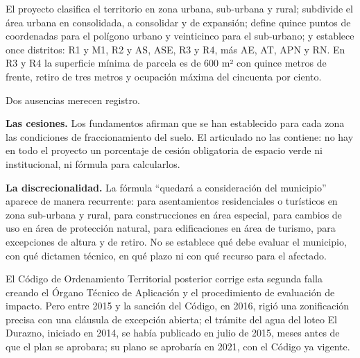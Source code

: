 El proyecto clasifica el territorio en zona urbana, sub-urbana y rural; subdivide el área urbana en consolidada, a consolidar y de expansión; define quince puntos de coordenadas para el polígono urbano y veinticinco para el sub-urbano; y establece once distritos: R1 y M1, R2 y AS, ASE, R3 y R4, más AE, AT, APN y RN. En R3 y R4 la superficie mínima de parcela es de 600 m² con quince metros de frente, retiro de tres metros y ocupación máxima del cincuenta por ciento.

Dos ausencias merecen registro.

\textbf{Las cesiones.} Los fundamentos afirman que se han establecido para cada zona las condiciones de fraccionamiento del suelo. El articulado no las contiene: no hay en todo el proyecto un porcentaje de cesión obligatoria de espacio verde ni institucional, ni fórmula para calcularlos.

\textbf{La discrecionalidad.} La fórmula ``quedará a consideración del municipio'' aparece de manera recurrente: para asentamientos residenciales o turísticos en zona sub-urbana y rural, para construcciones en área especial, para cambios de uso en área de protección natural, para edificaciones en área de turismo, para excepciones de altura y de retiro. No se establece qué debe evaluar el municipio, con qué dictamen técnico, en qué plazo ni con qué recurso para el afectado.

El Código de Ordenamiento Territorial posterior corrige esta segunda falla creando el Órgano Técnico de Aplicación y el procedimiento de evaluación de impacto. Pero entre 2015 y la sanción del Código, en 2016, rigió una zonificación precisa con una cláusula de excepción abierta; el trámite del agua del loteo El Durazno, iniciado en 2014, se había publicado en julio de 2015, meses antes de que el plan se aprobara; su plano se aprobaría en 2021, con el Código ya vigente.
